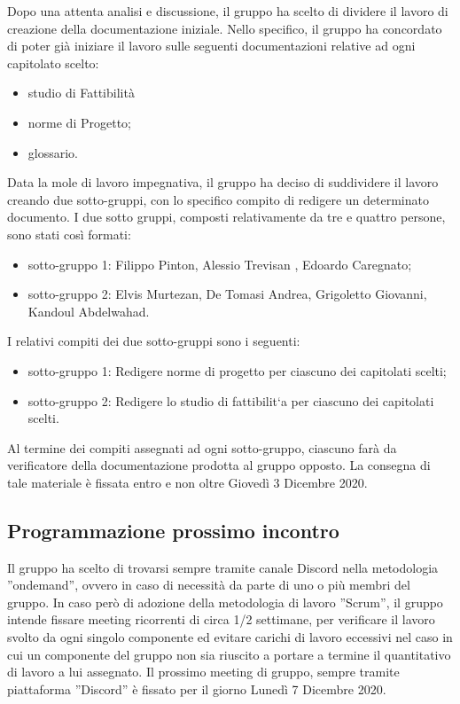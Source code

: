 Dopo una attenta analisi e discussione, il gruppo ha scelto di dividere il lavoro di
creazione della documentazione iniziale. Nello specifico, il gruppo ha concordato
di poter già iniziare il lavoro sulle seguenti documentazioni relative ad ogni
capitolato scelto:
\begin{itemize}
    \item studio di Fattibilità
    \item norme di Progetto;
    \item glossario.
\end{itemize}

Data la mole di lavoro impegnativa, il gruppo ha deciso di suddividere il lavoro
creando due sotto-gruppi, con lo specifico compito di redigere un determinato
documento. I due sotto gruppi, composti relativamente da tre e quattro persone,
sono stati così formati:
\begin{itemize}
    \item sotto-gruppo 1: Filippo Pinton, Alessio Trevisan , Edoardo Caregnato;
    \item sotto-gruppo 2: Elvis Murtezan, De Tomasi Andrea, Grigoletto Giovanni,
    Kandoul Abdelwahad.
\end{itemize}

I relativi compiti dei due sotto-gruppi sono i seguenti:
\begin{itemize}
    \item sotto-gruppo 1: Redigere norme di progetto per ciascuno dei capitolati scelti;
    \item sotto-gruppo 2: Redigere lo studio di fattibilit`a per ciascuno dei capitolati
    scelti.
\end{itemize}
Al termine dei compiti assegnati ad ogni sotto-gruppo, ciascuno farà da verificatore della documentazione prodotta al gruppo opposto. La consegna di tale
materiale è fissata entro e non oltre Giovedì 3 Dicembre 2020.
\subsection{Programmazione prossimo incontro}
Il gruppo ha scelto di trovarsi sempre tramite canale Discord nella metodologia
”ondemand”, ovvero in caso di necessità da parte di uno o più membri del
gruppo. In caso però di adozione della metodologia di lavoro ”Scrum”, il gruppo
intende fissare meeting ricorrenti di circa 1/2 settimane, per verificare il lavoro
svolto da ogni singolo componente ed evitare carichi di lavoro eccessivi nel caso in
cui un componente del gruppo non sia riuscito a portare a termine il quantitativo
di lavoro a lui assegnato.
Il prossimo meeting di gruppo, sempre tramite piattaforma ”Discord” è fissato
per il giorno Lunedì 7 Dicembre 2020.